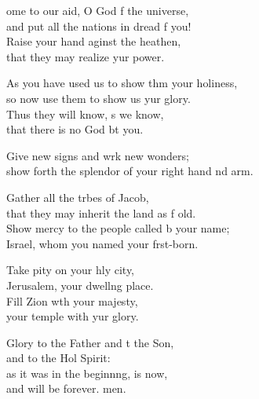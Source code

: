\settowidth{\versewidth}{show forth the splendor of your right hand and arm.}
\begin{psalmverse}%
  \begin{patverse}
ome to our aid, O God f the universe,\Med\\
and put all the nations in dread f you!\\
Raise your hand aginst the heathen,\Med\\
that they may realize yur power.

As you have used us to show thm your holiness,\Med\\
so now use them to show us yur glory.\\
Thus they will know, s we know,\Med\\
that there is no God bt you.

Give new signs and wrk new wonders;\Med\\
show forth the splendor of your right hand nd arm.

Gather all the tr\pointup{\i}bes of Jacob,\Med\\
that they may inherit the land as f old.\\
Show mercy to the people called b your name;\Med\\
Israel, whom you named your f\pointup{\i}rst-born.

Take pity on your hly city,\Med\\
Jerusalem, your dwell\pointup{\i}ng place.\\
Fill Zion w\pointup{\i}th your majesty,\Med\\
your temple with yur glory.

Glory to the Father and t the Son,\Med\\
and to the Hol Spirit:\\
as it was in the beginn\pointup{\i}ng, is now,\Med\\
and will be forever. men. 
  \end{patverse}
\end{psalmverse}
